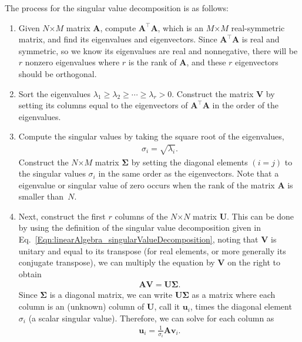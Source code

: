 The process for the singular value decomposition is as follows:
\begin{enumerate}
\item Given $N$$\times$$M$ matrix $\mathbf{A}$, compute $\mathbf{A}^\top \mathbf{A}$, which is an $M$$\times$$M$ real-symmetric matrix, and find its eigenvalues and eigenvectors. Since $\mathbf{A}^\top \mathbf{A}$ is real and symmetric, so we know its eigenvalues are real and nonnegative, there will be $r$ nonzero eigenvalues where $r$ is the rank of $\mathbf{A}$, and these $r$ eigenvectors should be orthogonal.
\item Sort the eigenvalues $\lambda_1 \ge \lambda_2 \ge \cdots \ge \lambda_r > 0$. Construct the matrix $\mathbf{V}$ by setting its columns equal to the eigenvectors of $\mathbf{A}^\top \mathbf{A}$ in the order of the eigenvalues.
\item Compute the singular values by taking the square root of the eigenvalues,
\begin{align}
  \sigma_i = \sqrt{\lambda_i} .
\end{align}
Construct the $N$$\times$$M$ matrix $\boldsymbol\Sigma$ by setting the diagonal elements $(i = j)$ to the singular values $\sigma_i$ in the same order as the eigenvectors. Note that a eigenvalue or singular value of zero occurs when the rank of the matrix $\mathbf{A}$ is smaller than~$N$.
\item Next, construct the first $r$ columns of the $N$$\times$$N$ matrix $\mathbf{U}$. This can be done by using the definition of the singular value decomposition given in Eq.~\eqref{Eqn:linearAlgebra_singularValueDecomposition}, noting that $\mathbf{V}$ is unitary and equal to its transpose (for real elements, or more generally its conjugate transpose), we can multiply the equation by $\mathbf{V}$ on the right to obtain
\begin{align} \label{Eqn:linearAlgebra_singularValueDecomposition}
  \mathbf{A V} = \mathbf{U} \boldsymbol\Sigma .
\end{align}
Since $\boldsymbol\Sigma$ is a diagonal matrix, we can write $\mathbf{U} \boldsymbol\Sigma$ as a matrix where each column is an (unknown) column of $\mathbf{U}$, call it $\mathbf{u}_i$, times the diagonal element $\sigma_i$ (a scalar singular value). Therefore, we can solve for each column as
\begin{align} \label{Eqn:singularValueDecomposition_computeUVectors}
  \mathbf{u}_i = \frac{1}{\sigma_i} \mathbf{A} \mathbf{v}_i .
\end{align}

\end{enumerate}
